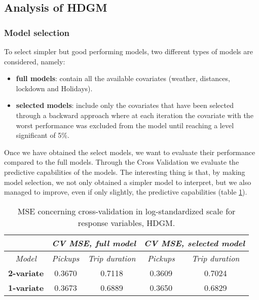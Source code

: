 \subsection{Analysis of HDGM}

\subsubsection{Model selection} To select simpler but good performing models, two different types of models are considered, namely:
\begin{itemize}
	\item \textbf{full models}: contain all the available covariates (weather, distances, lockdown and Holidays).
	\item \textbf{selected models}: include only the covariates that have been selected through a backward approach where at each iteration the covariate with the worst performance was excluded from the model until reaching a level significant of \num{5}\%.
\end{itemize}
Once we have obtained the select models, we want to evaluate their performance compared to the full models. Through the Cross Validation we evaluate the predictive capabilities of the models. The interesting thing is that, by making model selection, we not only obtained a simpler model to interpret, but we also managed to improve, even if only slightly, the predictive capabilities (table \ref{Cross-validation mean squared errors HDGM}).
 
\begin{table}
	\centering
	\renewcommand\arraystretch{1.3}
	\begin{tabular}{c|cc|cc}
		\hline
		\multicolumn{1}{l|}{} & \multicolumn{2}{c|}{\textit{CV MSE, full model}} & \multicolumn{2}{c}{\textit{CV MSE, selected model} }\\ 
		\hline
		\textit{Model} & \multicolumn{1}{c|}{\textit{Pickups}} & \textit{Trip duration} & \multicolumn{1}{c|}{\textit{Pickups}} & \textit{Trip duration} \\ 
		\hline
		\textbf{2-variate } & \multicolumn{1}{c|}{0.3670}  & 0.7118   & \multicolumn{1}{c|}{0.3609}  & 0.7024   \\ 
		\hline
		\textbf{1-variate } & \multicolumn{1}{c|}{0.3673}  & 0.6889   & \multicolumn{1}{c|}{0.3650}  & 0.6829   \\ 
		\hline
	\end{tabular}
	\caption[MSE concerning cross-validation in log-standardized scale for response variables (HDGM)]{MSE concerning cross-validation in log-standardized scale for response variables, HDGM.}
	\label{Cross-validation mean squared errors HDGM}
\end{table}


